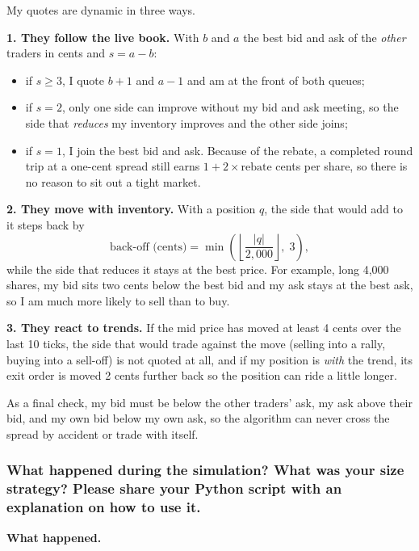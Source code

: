 \documentclass{article}
\begin{document}
My quotes are dynamic in three ways.

\textbf{1. They follow the live book.} With $b$ and $a$ the best bid and ask of the \emph{other}
traders in cents and $s = a - b$:
\begin{itemize}
  \item if $s \ge 3$, I quote $b+1$ and $a-1$ and am at the front of both queues;
  \item if $s = 2$, only one side can improve without my bid and ask meeting, so the side that
        \emph{reduces} my inventory improves and the other side joins;
  \item if $s = 1$, I join the best bid and ask. Because of the rebate, a completed round trip at a
        one-cent spread still earns $1 + 2\times\text{rebate}$ cents per share, so there is no reason to
        sit out a tight market.
\end{itemize}

\textbf{2. They move with inventory.} With a position $q$, the side that would add to it steps back by
\begin{equation}
  \text{back-off (cents)} = \min\!\left( \left\lfloor \frac{|q|}{2{,}000} \right\rfloor ,\; 3 \right),
\end{equation}
while the side that reduces it stays at the best price. For example, long 4,000 shares, my bid sits
two cents below the best bid and my ask stays at the best ask, so I am much more likely to sell than
to buy.

\textbf{3. They react to trends.} If the mid price has moved at least 4 cents over the last 10 ticks,
the side that would trade against the move (selling into a rally, buying into a sell-off) is not quoted
at all, and if my position is \emph{with} the trend, its exit order is moved 2 cents further back so the
position can ride a little longer.

As a final check, my bid must be below the other traders' ask, my ask above their bid, and my own bid
below my own ask, so the algorithm can never cross the spread by accident or trade with itself.

\subsubsection{What happened during the simulation? What was your size strategy? Please share
your Python script with an explanation on how to use it.}

\textbf{What happened.}
\end{document}
